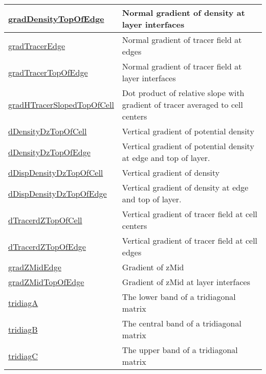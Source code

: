 {\begin{center}
\begin{longtable}{| p{2.0in} | p{4.0in} |}
    \hyperref[subsec:var_sec_scratch_gradDensityTopOfEdge]{gradDensityTopOfEdge} & Normal gradient of density at layer interfaces \\
    \hline
    \hyperref[subsec:var_sec_scratch_gradTracerEdge]{gradTracerEdge} & Normal gradient of tracer field at edges \\
    \hline
    \hyperref[subsec:var_sec_scratch_gradTracerTopOfEdge]{gradTracerTopOfEdge} & Normal gradient of tracer field at layer interfaces \\
    \hline
    \hyperref[subsec:var_sec_scratch_gradHTracerSlopedTopOfCell]{gradHTracerSlopedTopOfCell} & Dot product of relative slope with gradient of tracer averaged to cell centers \\
    \hline
    \hyperref[subsec:var_sec_scratch_dDensityDzTopOfCell]{dDensityDzTopOfCell} & Vertical gradient of potential density \\
    \hline
    \hyperref[subsec:var_sec_scratch_dDensityDzTopOfEdge]{dDensityDzTopOfEdge} & Vertical gradient of potential density at edge and top of layer. \\
    \hline
    \hyperref[subsec:var_sec_scratch_dDispDensityDzTopOfCell]{dDispDensityDzTopOfCell} & Vertical gradient of density \\
    \hline
    \hyperref[subsec:var_sec_scratch_dDispDensityDzTopOfEdge]{dDispDensityDzTopOfEdge} & Vertical gradient of density at edge and top of layer. \\
    \hline
    \hyperref[subsec:var_sec_scratch_dTracerdZTopOfCell]{dTracerdZTopOfCell} & Vertical gradient of tracer field at cell centers \\
    \hline
    \hyperref[subsec:var_sec_scratch_dTracerdZTopOfEdge]{dTracerdZTopOfEdge} & Vertical gradient of tracer field at cell edges \\
    \hline
    \hyperref[subsec:var_sec_scratch_gradZMidEdge]{gradZMidEdge} & Gradient of zMid \\
    \hline
    \hyperref[subsec:var_sec_scratch_gradZMidTopOfEdge]{gradZMidTopOfEdge} & Gradient of zMid at layer interfaces \\
    \hline
    \hyperref[subsec:var_sec_scratch_tridiagA]{tridiagA} & The lower band of a tridiagonal matrix \\
    \hline
    \hyperref[subsec:var_sec_scratch_tridiagB]{tridiagB} & The central band of a tridiagonal matrix \\
    \hline
    \hyperref[subsec:var_sec_scratch_tridiagC]{tridiagC} & The upper band of a tridiagonal matrix \\

\end{longtable}
\end{center}}
